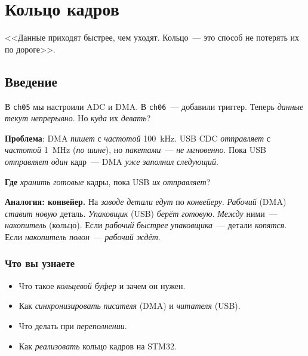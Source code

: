
\chapter{Кольцо кадров}
\label{ch:ring-buffer}

\epigraph{<<Данные приходят быстрее, чем уходят. Кольцо~---
это способ не потерять их по дороге>>.}{}

\section{Введение}
\label{sec:ring-intro}

В \texttt{ch05} мы настроили ADC и DMA. В \texttt{ch06}~---
добавили триггер. Теперь \emph{данные} \emph{текут}
\emph{непрерывно}. Но \emph{куда} их \emph{девать}?

\textbf{Проблема}: DMA \emph{пишет} с \emph{частотой}
\SI{100}{\kilo\hertz}. USB CDC \emph{отправляет} с
\emph{частотой} \SI{1}{\mega\hertz} (\emph{по} \emph{шине}),
но \emph{пакетами}~--- \emph{не} \emph{мгновенно}.
Пока USB \emph{отправляет} \emph{один} кадр~--- DMA
\emph{уже} \emph{заполнил} \emph{следующий}.

\textbf{Где} \emph{хранить} \emph{готовые} кадры, пока
USB \emph{их} \emph{отправляет}?

\begin{ideabox}
\textbf{Аналогия: конвейер.} На \emph{заводе} \emph{детали}
\emph{едут} по \emph{конвейеру}. \emph{Рабочий} (DMA)
\emph{ставит} \emph{новую} деталь. \emph{Упаковщик} (USB)
\emph{берёт} \emph{готовую}. \emph{Между} ними~---
\emph{накопитель} (кольцо). Если \emph{рабочий} \emph{быстрее}
\emph{упаковщика}~--- детали \emph{копятся}. Если \emph{накопитель}
\emph{полон}~--- \emph{рабочий} \emph{ждёт}.
\end{ideabox}

\subsection{Что вы узнаете}

\begin{itemize}
    \item Что такое \emph{кольцевой буфер} и зачем он нужен.
    \item Как \emph{синхронизировать} \emph{писателя} (DMA)
          и \emph{читателя} (USB).
    \item Что делать при \emph{переполнении}.
    \item Как \emph{реализовать} кольцо кадров на STM32.
\end{itemize}

